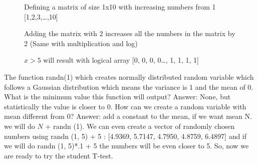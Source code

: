 \begin{figure}[!ht]
    \centering
    \caption{Defining a matrix of size 1x10 with increasing numbers from 1 [1,2,3,…,10]} \label{fig:defmat}
\end{figure}

\begin{figure}[!ht]
    \centering
    \caption{Adding the matrix with 2 increases all the numbers in the matrix by 2 (Same with multiplication and log)} \label{fig:defmat2}
\end{figure}

\begin{figure}[!ht]
    \centering
    \caption{\(x>5\) will result with logical array [0, 0, 0, 0…, 1, 1, 1, 1]} \label{fig:defmat3}
\end{figure}

The function randn(1) which creates normally distributed random variable which
follows a Gaussian distribution which means the variance is 1 and the mean of 0.
What is the minimum value this function will output? Answer: None, but
statistically the value is closer to 0. How can we create a random variable with
mean different from 0? Answer: add a constant to the mean, if we want mean N. we will do $N$ +
randn (1). We can even create a vector of randomly chosen numbers using randn
(1, 5) + 5 : [4.9369, 5.7147, 4.7950, 4.8759, 6.4897] and if we will do randn
(1, 5)*.1 + 5 the numbers will be even closer to 5. So, now we are ready to try
the student T-test.

